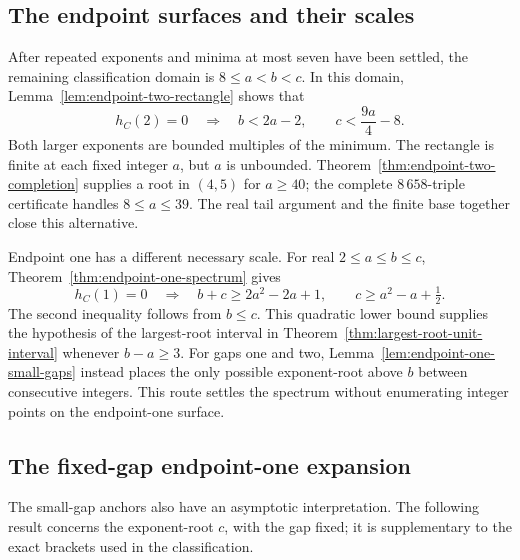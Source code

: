 \subsection{The endpoint surfaces and their scales}

After repeated exponents and minima at most seven have been settled,
the remaining classification domain is $8\leq a<b<c$. In this domain,
Lemma~\ref{lem:endpoint-two-rectangle} shows that
\[
 h_C(2)=0\quad\Longrightarrow\quad
 b<2a-2,\qquad c<\frac{9a}{4}-8.
\]
Both larger exponents are bounded multiples of the minimum. The
rectangle is finite at each fixed integer $a$, but $a$ is unbounded.
Theorem~\ref{thm:endpoint-two-completion} supplies a root in $(4,5)$
for $a\geq40$; the complete $8\,658$-triple certificate handles
$8\leq a\leq39$. The real tail argument and the finite base together
close this alternative.

Endpoint one has a different necessary scale. For real
$2\leq a\leq b\leq c$, Theorem~\ref{thm:endpoint-one-spectrum} gives
\[
 h_C(1)=0\quad\Longrightarrow\quad
 b+c\geq2a^2-2a+1,\qquad c\geq a^2-a+\tfrac12.
\]
The second inequality follows from $b\leq c$. This quadratic lower
bound supplies the hypothesis of the largest-root interval in
Theorem~\ref{thm:largest-root-unit-interval} whenever $b-a\geq3$.
For gaps one and two, Lemma~\ref{lem:endpoint-one-small-gaps} instead
places the only possible exponent-root above $b$ between consecutive
integers. This route settles the spectrum without enumerating integer
points on the endpoint-one surface.

\subsection{The fixed-gap endpoint-one expansion}

The small-gap anchors also have an asymptotic interpretation. The
following result concerns the exponent-root $c$, with the gap fixed;
it is supplementary to the exact brackets used in the classification.

